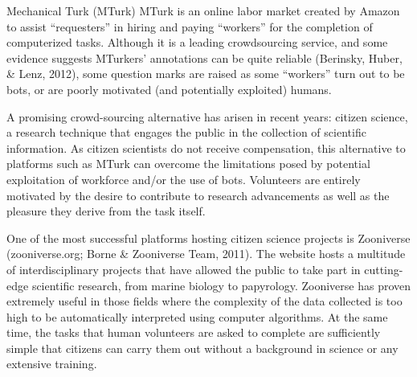 \documentclass[english,,man,floatsintext]{apa6}
\begin{document}
Mechanical Turk (MTurk) MTurk is an online labor market created by Amazon to assist \enquote{requesters} in hiring and paying \enquote{workers} for the completion of computerized tasks. Although it is a leading crowdsourcing service, and some evidence suggests MTurkers' annotations can be quite reliable (Berinsky, Huber, \& Lenz, 2012), some question marks are raised as some \enquote{workers} turn out to be bots, or are poorly motivated (and potentially exploited) humans.

A promising crowd-sourcing alternative has arisen in recent years: citizen science, a research technique that engages the public in the collection of scientific information. As citizen scientists do not receive compensation, this alternative to platforms such as MTurk can overcome the limitations posed by potential exploitation of workforce and/or the use of bots. Volunteers are entirely motivated by the desire to contribute to research advancements as well as the pleasure they derive from the task itself.

One of the most successful platforms hosting citizen science projects is Zooniverse (zooniverse.org; Borne \& Zooniverse Team, 2011). The website hosts a multitude of interdisciplinary projects that have allowed the public to take part in cutting-edge scientific research, from marine biology to papyrology. Zooniverse has proven extremely useful in those fields where the complexity of the data collected is too high to be automatically interpreted using computer algorithms. At the same time, the tasks that human volunteers are asked to complete are sufficiently simple that citizens can carry them out without a background in science or any extensive training.
\end{document}

